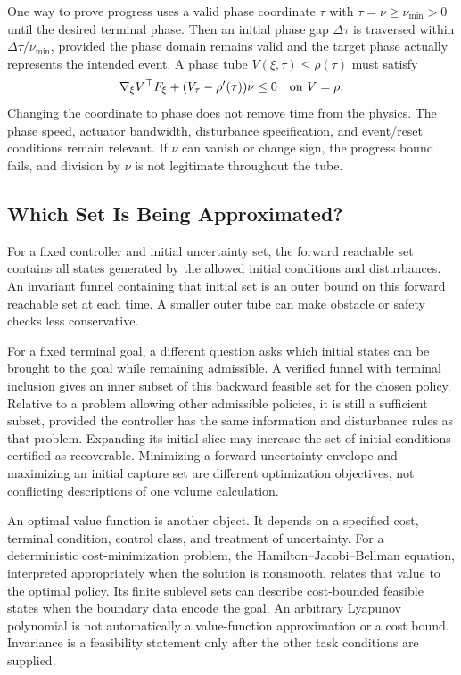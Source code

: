 One way to prove progress uses a valid phase coordinate $\tau$ with $\dot\tau=\nu\geq\nu_{\min}>0$ until the desired terminal phase. Then an initial phase gap $\Delta\tau$ is traversed within $\Delta\tau/\nu_{\min}$, provided the phase domain remains valid and the target phase actually represents the intended event. A phase tube $V(\xi,\tau)\leq\rho(\tau)$ must satisfy
\begin{equation}
 \nabla_\xi V^\top F_\xi+(V_\tau-\rho'(\tau))\nu\leq0
 \quad\hbox{on }V=\rho.
 \label{eq:funnel_phase_condition}
\end{equation}
Changing the coordinate to phase does not remove time from the physics. The phase speed, actuator bandwidth, disturbance specification, and event/reset conditions remain relevant. If $\nu$ can vanish or change sign, the progress bound fails, and division by $\nu$ is not legitimate throughout the tube.

\subsection{Which Set Is Being Approximated?}

For a fixed controller and initial uncertainty set, the forward reachable set contains all states generated by the allowed initial conditions and disturbances. An invariant funnel containing that initial set is an outer bound on this forward reachable set at each time. A smaller outer tube can make obstacle or safety checks less conservative.

For a fixed terminal goal, a different question asks which initial states can be brought to the goal while remaining admissible. A verified funnel with terminal inclusion gives an inner subset of this backward feasible set for the chosen policy. Relative to a problem allowing other admissible policies, it is still a sufficient subset, provided the controller has the same information and disturbance rules as that problem. Expanding its initial slice may increase the set of initial conditions certified as recoverable. Minimizing a forward uncertainty envelope and maximizing an initial capture set are different optimization objectives, not conflicting descriptions of one volume calculation.

An optimal value function is another object. It depends on a specified cost, terminal condition, control class, and treatment of uncertainty. For a deterministic cost-minimization problem, the Hamilton--Jacobi--Bellman equation, interpreted appropriately when the solution is nonsmooth, relates that value to the optimal policy. Its finite sublevel sets can describe cost-bounded feasible states when the boundary data encode the goal. An arbitrary Lyapunov polynomial is not automatically a value-function approximation or a cost bound. Invariance is a feasibility statement only after the other task conditions are supplied.

